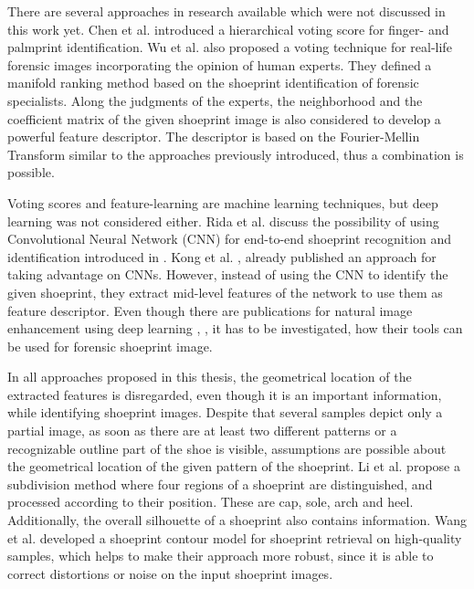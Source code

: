 \documentclass[draft,final]{vutinfth} %
\begin{document}
\par
There are several approaches in research available which were not discussed in this work yet.
Chen et al. \cite{chen2013hierarchical} introduced a hierarchical voting score for finger- and palmprint identification.
Wu et al. \cite{wu2019losgsr} also proposed a voting technique for real-life forensic images incorporating the opinion of human experts.
They defined a manifold ranking method based on the shoeprint identification of forensic specialists.
Along the judgments of the experts, the neighborhood and the coefficient matrix of the given shoeprint image is also considered to develop a powerful feature descriptor.
The descriptor is based on the Fourier-Mellin Transform similar to the approaches previously introduced, thus a combination is possible.
\par
Voting scores and feature-learning are machine learning techniques, but deep learning \cite{lecun2015deep} was not considered either.
Rida et al. \cite{rida2019forensic} discuss the possibility of using Convolutional Neural Network (CNN) for end-to-end shoeprint recognition and identification introduced in \cite{lecun1998gradient}.
Kong et al. \cite{kong2017cross}, \cite{kong2019cross} already published an approach for taking advantage on CNNs.
However, instead of using the CNN to identify the given shoeprint, they extract mid-level features of the network to use them as feature descriptor.
Even though there are publications for natural image enhancement using deep learning \cite{gharbi2017deep}, \cite{chen2018deep}, it has to be investigated, how their tools can be used for forensic shoeprint image.
\par
In all approaches proposed in this thesis, the geometrical location of the extracted features is disregarded, even though it is an important information, while identifying shoeprint images.
Despite that several samples depict only a partial image, as soon as there are at least two different patterns or a recognizable outline part of the shoe is visible, assumptions are possible about the geometrical location of the given pattern of the shoeprint.
Li et al. \cite{li2015secondary} propose a subdivision method where four regions of a shoeprint are distinguished, and processed according to their position.
These are cap, sole, arch and heel.
Additionally, the overall silhouette of a shoeprint also contains information.
Wang et al. \cite{wang2014automatic} developed a shoeprint contour model for shoeprint retrieval on high-quality samples, which helps to make their approach more robust, since it is able to correct distortions or noise on the input shoeprint images.
\end{document}
